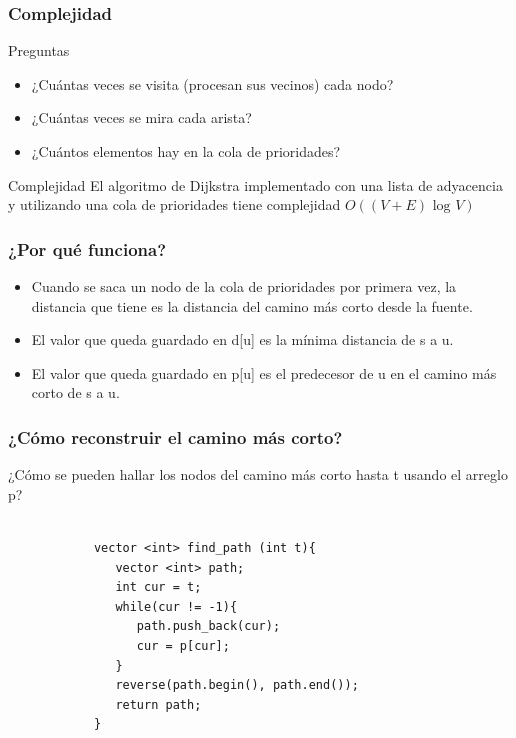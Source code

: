 \documentclass{beamer}
\begin{document}
	\begin{frame}
		\frametitle{Complejidad}
		\begin{alertblock}{Preguntas}
			\begin{itemize}
				\item ¿Cuántas veces se visita (procesan sus vecinos) cada nodo?
				\item ¿Cuántas veces se mira cada arista?
				\item ¿Cuántos elementos hay en la cola de prioridades?
			\end{itemize}
		\end{alertblock}
		\pause
		\begin{block}{Complejidad}
			El algoritmo de Dijkstra implementado con una lista de adyacencia y utilizando una cola de prioridades tiene complejidad $O((V+E) \text{ log } V)$
		\end{block}
	\end{frame}
	
	\begin{frame}
		\frametitle{¿Por qué funciona?}
		\begin{itemize}
			\item Cuando se saca un nodo de la cola de prioridades por primera vez, la distancia que tiene es la distancia del camino más corto desde la fuente.
			\item El valor que queda guardado en d[u] es la mínima distancia de s a u.
			\item El valor que queda guardado en p[u] es el predecesor de u en el camino más corto de s a u.
		\end{itemize}
	\end{frame}
	
	\begin{frame}[fragile]
		\frametitle{¿Cómo reconstruir el camino más corto?}
		¿Cómo se pueden hallar los nodos del camino más corto hasta t usando el arreglo p? \\ \quad \\
		\pause
		\begin{lstlisting}
			vector <int> find_path (int t){
			   vector <int> path;
			   int cur = t;
			   while(cur != -1){
			      path.push_back(cur);
			      cur = p[cur];
			   }
			   reverse(path.begin(), path.end());
			   return path;
			}
		\end{lstlisting}
	\end{frame}
\end{document}
